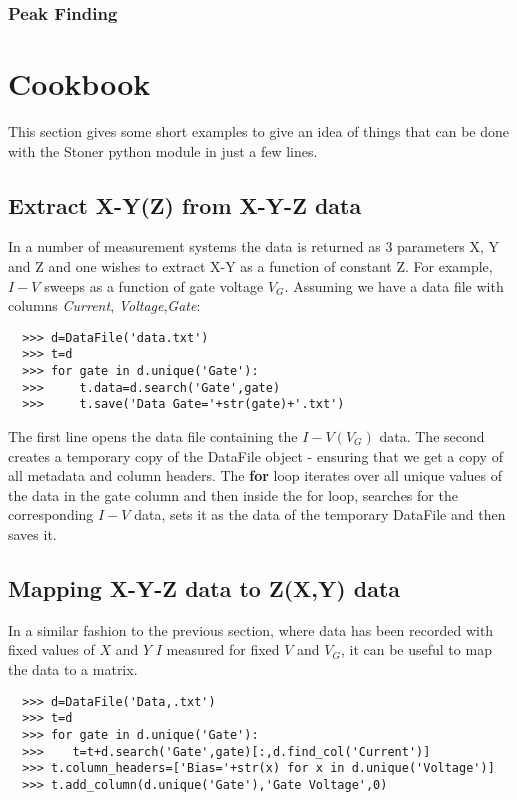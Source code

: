 \documentclass[a4paper,11pt]{scrartcl}
\begin{document}
\subsubsection{Peak Finding}

\section{Cookbook}

This section gives some short examples to give an idea of things that can be
done with the Stoner python module in just a few lines.

\subsection{Extract X-Y(Z) from X-Y-Z data}

In a number of measurement systems the data is returned as 3 parameters X, Y and
Z and one wishes to extract X-Y as a function of constant Z. For example, $I-V$
sweeps as a function of gate voltage $V_G$. Assuming we have a data file with
columns \textit{Current}, \textit{Voltage},\textit{Gate}:

\begin{verbatim}
  >>> d=DataFile('data.txt')
  >>> t=d
  >>> for gate in d.unique('Gate'):
  >>>     t.data=d.search('Gate',gate)
  >>>     t.save('Data Gate='+str(gate)+'.txt')
\end{verbatim}

The first line opens the data file containing the $I-V(V_G)$ data. The second
creates a temporary copy of the DataFile object - ensuring that we get a copy of
all metadata and column headers. The \textbf{for} loop iterates over all unique
values of the data in the gate column and then inside the for loop, searches for
the corresponding $I-V$ data, sets it as the data of the temporary DataFile and
then saves it.

\subsection{Mapping X-Y-Z data to Z(X,Y) data}

In a similar fashion to the previous section, where data has been recorded with
fixed values of $X$ and $Y$ \eg $I$ measured for fixed $V$ and $V_G$, it can be
useful to map the data to a matrix.

\begin{verbatim}
  >>> d=DataFile('Data,.txt')
  >>> t=d
  >>> for gate in d.unique('Gate'):
  >>>    t=t+d.search('Gate',gate)[:,d.find_col('Current')]
  >>> t.column_headers=['Bias='+str(x) for x in d.unique('Voltage')]
  >>> t.add_column(d.unique('Gate'),'Gate Voltage',0)
\end{verbatim}
\end{document}
